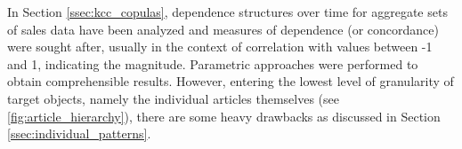
In Section \ref{ssec:kcc_copulas}, dependence structures over time for aggregate sets of sales data have been analyzed and measures of dependence (or concordance) were sought after, usually in the context of correlation with values between -1 and 1, indicating the magnitude. Parametric approaches were performed to obtain comprehensible results. However, entering the lowest level of granularity of target objects, namely the individual articles themselves (see \autoref{fig:article_hierarchy}), there are some heavy drawbacks as discussed in Section \ref{ssec:individual_patterns}.



